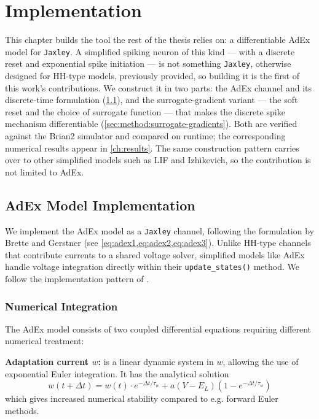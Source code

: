 \chapter{Implementation}\label{ch:implementation}

This chapter builds the tool the rest of the thesis relies on: a differentiable \gls{AdEx} model for \texttt{Jaxley}.
A simplified spiking neuron of this kind --- with a discrete reset and exponential spike initiation --- is not something \texttt{Jaxley}, otherwise designed for \gls{HH}-type models, previously provided, so building it is the first of this work's contributions.
We construct it in two parts: the \gls{AdEx} channel and its discrete-time formulation (\cref{sec:method:adex_impl}), and the surrogate-gradient variant --- the soft reset and the choice of surrogate function --- that makes the discrete spike mechanism differentiable (\cref{sec:method:surrogate-gradients}).
Both are verified against the Brian2 simulator and compared on runtime; the corresponding numerical results appear in \cref{ch:results}.
The same construction pattern carries over to other simplified models such as \gls{LIF} and Izhikevich, so the contribution is not limited to \gls{AdEx}.


\section{AdEx Model Implementation}\label{sec:method:adex_impl}
We implement the \gls{AdEx} model as a \texttt{Jaxley} channel, following the formulation by Brette and Gerstner \cite{Brette2005} (see \cref{eq:adex1,eq:adex2,eq:adex3}).
Unlike \gls{HH}-type channels that contribute currents to a shared voltage solver, simplified models like \gls{AdEx} handle voltage integration directly within their \texttt{update\_states()} method.
We follow the implementation pattern of \cite{Deistler2025}.

\subsection{Numerical Integration}\label{sec:method:adex:numerics}
The \gls{AdEx} model consists of two coupled differential equations requiring different numerical treatment:

\textbf{Adaptation current $w$:}
 is a linear dynamic system in $w$, allowing the use of exponential Euler integration.
It has the analytical solution
\begin{equation}\label{eq:adaptation-current-integration}
  w(t+\Delta t) = w(t) \cdot e^{-\Delta t / \tau_w} + a(V - E_L)(1 - e^{-\Delta t / \tau_w})
\end{equation}
which gives increased numerical stability compared to e.g. forward Euler methods.

